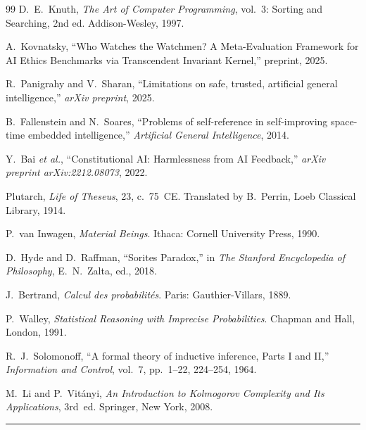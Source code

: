 \documentclass[11pt,a4paper]{article}
\theoremstyle{definition}
\theoremstyle{plain}
\theoremstyle{remark}
\begin{document}
\begin{thebibliography}{99}
D.~E.~Knuth, \textit{The Art of Computer Programming}, vol.~3: Sorting and Searching, 2nd ed. Addison-Wesley, 1997.

A.~Kovnatsky, ``Who Watches the Watchmen? A Meta-Evaluation Framework for AI Ethics Benchmarks via Transcendent Invariant Kernel,'' preprint, 2025.

R.~Panigrahy and V.~Sharan, ``Limitations on safe, trusted, artificial general intelligence,'' \textit{arXiv preprint}, 2025.

B.~Fallenstein and N.~Soares, ``Problems of self-reference in self-improving space-time embedded intelligence,'' \textit{Artificial General Intelligence}, 2014.

Y.~Bai \textit{et al.}, ``Constitutional AI: Harmlessness from AI Feedback,'' \textit{arXiv preprint arXiv:2212.08073}, 2022.

Plutarch, \textit{Life of Theseus}, 23, c.~75~CE. Translated by B.~Perrin, Loeb Classical Library, 1914.

P.~van Inwagen, \textit{Material Beings}. Ithaca: Cornell University Press, 1990.

D.~Hyde and D.~Raffman, ``Sorites Paradox,'' in \textit{The Stanford Encyclopedia of Philosophy}, E.~N.~Zalta, ed., 2018.

J.~Bertrand, \textit{Calcul des probabilit\'{e}s}. Paris: Gauthier-Villars, 1889.

P.~Walley, \textit{Statistical Reasoning with Imprecise Probabilities}.
Chapman and Hall, London, 1991.

R.~J.~Solomonoff, ``A formal theory of inductive inference, Parts I and II,''
\textit{Information and Control}, vol.~7, pp.~1--22, 224--254, 1964.

M.~Li and P.~Vit\'{a}nyi, \textit{An Introduction to Kolmogorov Complexity and Its Applications},
3rd~ed. Springer, New York, 2008.


\end{thebibliography}

\vfill

\noindent\rule{\textwidth}{0.4pt}
\vspace{0.3cm}
\end{document}
